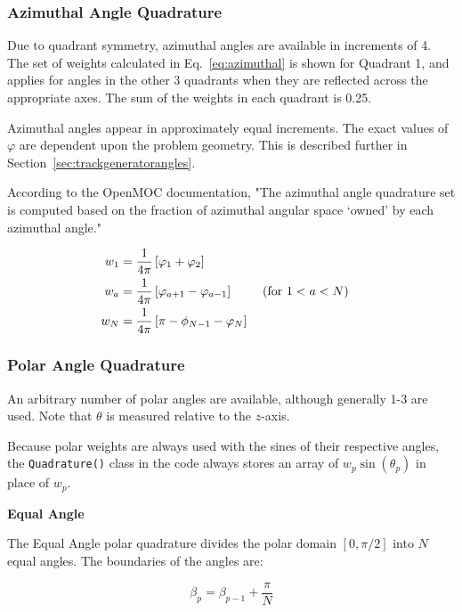 \documentclass[12pt]{article}
\begin{document}
\subsubsection{Azimuthal Angle Quadrature}\label{sec:azimuthal}

Due to quadrant symmetry, azimuthal angles are available in increments of 4. The set of weights calculated in Eq.~\ref{eq:azimuthal} is shown for Quadrant 1, and applies for angles in the other 3 quadrants when they are reflected across the appropriate axes. The sum of the weights in each quadrant is 0.25.

Azimuthal angles appear in approximately equal increments. The exact values of $\varphi$ are dependent upon the problem geometry. This is described further in Section~\ref{sec:trackgeneratorangles}.

According to the OpenMOC documentation, "The azimuthal angle quadrature set is computed based on the fraction of azimuthal angular space `owned' by each azimuthal angle." 

\begin{align}\label{eq:azimuthal}
w_1 &= \frac{1}{4\pi} \left[ \varphi_1 + \varphi_2 \right]
\cr
w_a &= \frac{1}{4\pi} \left[ \varphi_{a+1} - \varphi_{a-1} \right] 
 \hspace{24pt}(\text{for } 1 < a < N)
\cr
w_N &= \frac{1}{4\pi} \left[ \pi - \phi_{N-1} - \varphi_N \right]
\end{align}

\subsubsection{Polar Angle Quadrature}\label{sec:polar}

An arbitrary number of polar angles are available, although generally 1-3 are used. Note that $\theta$ is measured relative to the $z$-axis.

Because polar weights are always used with the sines of their respective angles, the \texttt{Quadrature()} class in the code always stores an array of $w_p \sin(\theta_p)$ in place of $w_p$.

\textbf{Equal Angle}

The Equal Angle polar quadrature divides the polar domain $[0, \pi/2]$ into $N$ equal angles. The boundaries of the angles are:

\begin{equation}\label{eq:equalboundaries}
\beta_p = \beta_{p-1}  + \frac{\pi}{N}
\end{equation}
\end{document}
